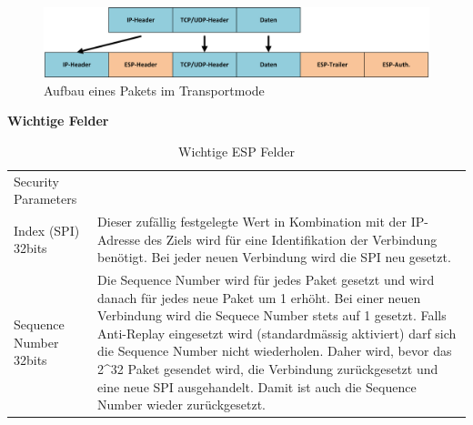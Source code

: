 \begin{figure}[H]
    \begin{center}
        \includegraphics[trim=1 0 0 0,clip,width=\textwidth]{mainpart/analyse/img/ESP_Transportmode.png}
    \end{center}
    \caption{Aufbau eines Pakets im Transportmode}
\end{figure}


\textbf{Wichtige Felder}

\begin{table}[H]
\begin{tabularx}{\textwidth}{l|>{\raggedright\arraybackslash}X} 
\hline
Security Parameters\\ Index (SPI) 32bits & Dieser zufällig festgelegte Wert in Kombination mit der IP-Adresse des Ziels wird für eine Identifikation der Verbindung benötigt. Bei jeder neuen Verbindung wird die SPI neu gesetzt.                                                                                                                                                                                                                                                                         \\ \hline
Sequence Number 32bits & Die Sequence Number wird für jedes Paket gesetzt und wird danach für jedes neue Paket um 1 erhöht. Bei einer neuen Verbindung wird die Sequece Number stets auf 1 gesetzt. Falls Anti-Replay eingesetzt wird (standardmässig aktiviert) darf sich die Sequence Number nicht wiederholen. Daher wird, bevor das 2\^{}32 Paket gesendet wird, die Verbindung zurückgesetzt und eine neue SPI ausgehandelt. Damit ist auch die Sequence Number wieder zurückgesetzt. \\
\hline
\end{tabularx}
\caption{Wichtige ESP Felder}
\end{table}